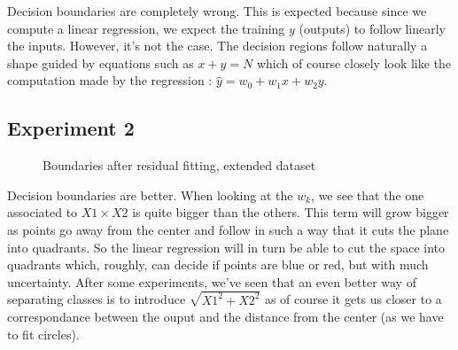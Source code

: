 \documentclass{article}
\begin{document}
Decision boundaries are completely wrong.
This is expected because since we compute a linear regression, we expect
the training $y$ (outputs) to follow linearly the inputs. However, it's not the case. The decision  regions follow naturally a shape guided by equations such as $x + y = N$ which of course closely look like the computation made by the regression :  $\hat{y} = w_0 + w_1 x + w_2 y$.

\subsection{Experiment 2}
	\begin{figure}[H]
	\centering

	\caption{\label{resfit1}Boundaries after residual fitting, extended dataset}
     \end{figure}

Decision boundaries are better.
When looking at the $w_k$, we see that the one associated to $X1 \times X2$ is quite bigger than the others. This term will grow bigger as points go away from the center and follow in such a way that it cuts the plane into quadrants. So the linear regression will in turn be able to cut the space into quadrants which, roughly, can decide if points are blue or red, but with much uncertainty. After some experiments, we've seen that an even better way of separating classes is to introduce $\sqrt{X1 ^ 2 + X2 ^ 2}$ as of course it gets us closer to a correspondance between the ouput and the distance from the center (as we have to fit circles).

\end{document}
